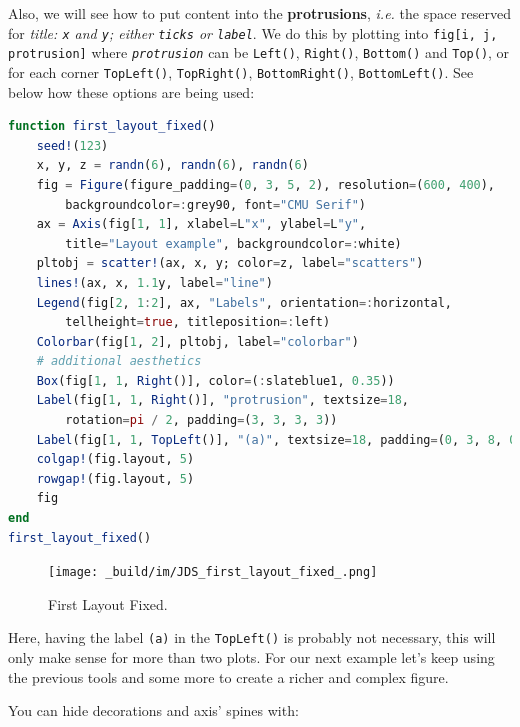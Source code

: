 \documentclass[
  notoc %
]{tufte-book}
\newcommand{\passthrough}[1]{#1}
\begin{document}
Also, we will see how to put content into the \textbf{protrusions},
\emph{i.e.} the space reserved for \emph{title:
\passthrough{\lstinline!x!} and \passthrough{\lstinline!y!}; either
\passthrough{\lstinline!ticks!} or \passthrough{\lstinline!label!}}. We
do this by plotting into \passthrough{\lstinline!fig[i, j, protrusion]!}
where \emph{\passthrough{\lstinline!protrusion!}} can be
\passthrough{\lstinline!Left()!}, \passthrough{\lstinline!Right()!},
\passthrough{\lstinline!Bottom()!} and \passthrough{\lstinline!Top()!},
or for each corner \passthrough{\lstinline!TopLeft()!},
\passthrough{\lstinline!TopRight()!},
\passthrough{\lstinline!BottomRight()!},
\passthrough{\lstinline!BottomLeft()!}. See below how these options are
being used:

\begin{lstlisting}[language=Julia]
function first_layout_fixed()
    seed!(123)
    x, y, z = randn(6), randn(6), randn(6)
    fig = Figure(figure_padding=(0, 3, 5, 2), resolution=(600, 400),
        backgroundcolor=:grey90, font="CMU Serif")
    ax = Axis(fig[1, 1], xlabel=L"x", ylabel=L"y",
        title="Layout example", backgroundcolor=:white)
    pltobj = scatter!(ax, x, y; color=z, label="scatters")
    lines!(ax, x, 1.1y, label="line")
    Legend(fig[2, 1:2], ax, "Labels", orientation=:horizontal,
        tellheight=true, titleposition=:left)
    Colorbar(fig[1, 2], pltobj, label="colorbar")
    # additional aesthetics
    Box(fig[1, 1, Right()], color=(:slateblue1, 0.35))
    Label(fig[1, 1, Right()], "protrusion", textsize=18,
        rotation=pi / 2, padding=(3, 3, 3, 3))
    Label(fig[1, 1, TopLeft()], "(a)", textsize=18, padding=(0, 3, 8, 0))
    colgap!(fig.layout, 5)
    rowgap!(fig.layout, 5)
    fig
end
first_layout_fixed()
\end{lstlisting}

\begin{figure}
\hypertarget{fig:first_layout_fixed}{%
\centering
\texttt{[image: \_build/im/JDS\_first\_layout\_fixed\_.png]}
\caption{First Layout Fixed.}\label{fig:first_layout_fixed}
}
\end{figure}

Here, having the label \passthrough{\lstinline!(a)!} in the
\passthrough{\lstinline!TopLeft()!} is probably not necessary, this will
only make sense for more than two plots. For our next example let's keep
using the previous tools and some more to create a richer and complex
figure.

You can hide decorations and axis' spines with:
\end{document}
